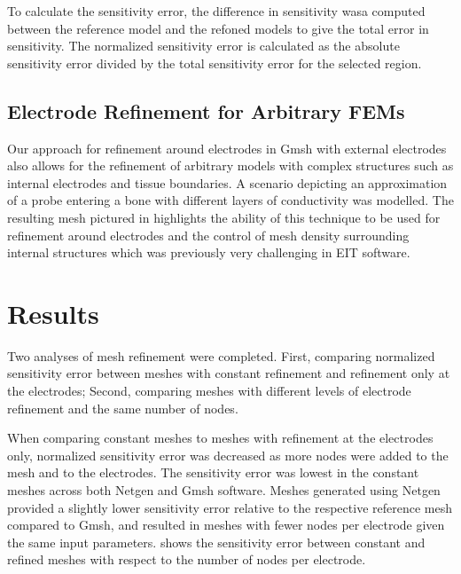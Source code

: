To calculate the sensitivity error, the difference in sensitivity wasa computed between the 
reference model and the refoned models to give the total error in sensitivity.
The normalized sensitivity error is calculated as the absolute sensitivity error 
divided by the total sensitivity error
for the selected region.


\subsection{Electrode Refinement for Arbitrary FEMs}
Our approach for refinement around electrodes in Gmsh with external electrodes 
also allows for the refinement of arbitrary models with complex structures
such as internal electrodes and tissue boundaries.
A scenario depicting an approximation of 
a probe entering a bone with different 
layers of conductivity was modelled. The resulting mesh pictured in 
highlights the ability of this technique
to be used for refinement around electrodes and the control of mesh density  
surrounding internal structures which was previously
very challenging in EIT software.

\section{Results}

Two analyses of mesh refinement were completed. First, comparing normalized sensitivity error between
meshes with constant refinement and refinement only at the electrodes; Second,
comparing meshes with different levels of electrode refinement and the same number of nodes.

When comparing constant meshes to meshes with refinement at the electrodes only, 
normalized sensitivity error
was decreased as more nodes were added to the mesh and to the electrodes. The sensitivity
error was lowest in the constant meshes across both Netgen and Gmsh software. Meshes 
generated using Netgen
provided a slightly lower sensitivity error relative to the respective reference mesh
compared to Gmsh, and resulted in meshes with fewer nodes per electrode given the same input
parameters.  shows the sensitivity error between
constant and refined meshes with respect to the number of nodes per electrode.  

